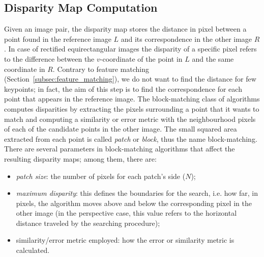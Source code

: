 \subsection{Disparity Map Computation}
\label{subsec:disparityMap}
Given an image pair, the disparity map stores the distance in pixel between 
a point found in the reference image $L$ and its correspondence in the
other image $R$.
In case of rectified equirectangular images the disparity of a specific pixel
refers to the difference between the $v$-coordinate of the point in $L$ and the
same coordinate in $R$.
Contrary to feature matching (Section~\ref{subsec:feature_matching}), we do not
want to find the distance for few keypoints; in fact, the aim of this step is to
find the correspondence for each point that appears in the reference image.
The block-matching class of algorithms computes disparities by extracting the 
pixels surrounding a point that it wants to match and computing a similarity
or error metric with the neighbourhood pixels of each of the candidate points
in the other image. The small squared area extracted from each point is called
\emph{patch} or \emph{block}, thus the name block-matching.
There are several parameters in block-matching algorithms that affect the
resulting disparity maps; among them, there are:
\begin{itemize}
	\item \emph{patch size}: the number of pixels for each patch's side ($N$);
	\item \emph{maximum disparity}: this defines the boundaries for the search,
	i.e. how far, in pixels, the algorithm moves
	above and below the corresponding pixel in the other image
	(in the perspective case, this value refers to the
	horizontal distance traveled by the searching procedure);
	\item similarity/error metric employed: how the error or similarity metric
	is calculated.
\end{itemize}

